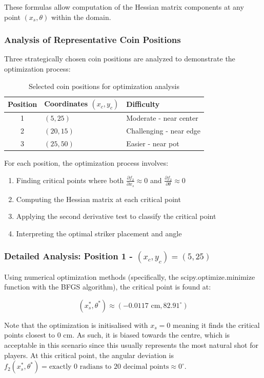 \documentclass[10pt]{article}
\begin{document}
These formulas allow computation of the Hessian matrix components at any point $(x_s, \theta)$ within the domain.

\subsubsection{Analysis of Representative Coin Positions}
Three strategically chosen coin positions are analyzed to demonstrate the optimization process:

\begin{table}[h]
\centering
\begin{tabular}{|c|l|l|}
\hline
\textbf{Position} & \textbf{Coordinates $(x_c, y_c)$} & \textbf{Difficulty} \\
\hline
1 & $(5, 25)$ & Moderate - near center \\
2 & $(20, 15)$ & Challenging - near edge \\
3 & $(25, 50)$ & Easier - near pot \\
\hline
\end{tabular}
\caption{Selected coin positions for optimization analysis}
\end{table}

For each position, the optimization process involves:
\begin{enumerate}
    \item Finding critical points where both $\frac{\partial f_2}{\partial x_s} \approx 0$ and $\frac{\partial f_2}{\partial \theta} \approx 0$
    \item Computing the Hessian matrix at each critical point
    \item Applying the second derivative test to classify the critical point
    \item Interpreting the optimal striker placement and angle
\end{enumerate}

\subsubsection{Detailed Analysis: Position 1 - $(x_c, y_c) = (5, 25)$}

Using numerical optimization methods (specifically, the scipy.optimize.minimize function with the BFGS algorithm), the critical point is found at:

\[
(x_s^*, \theta^*) \approx (-0.0117 \text{ cm}, 82.91^{\circ})
\]

Note that the optimization is initisalised with $x_s = 0$ meaning it finds the critical points closest to 0 cm. As such, it is biased towards the centre, which is acceptable in this scenario since this usually represents the most natural shot for players. At this critical point, the angular deviation is $f_2(x_s^*, \theta^*) = \text{exactly } 0 \text{ radians to 20 decimal points} \approx 0^\circ$.
\end{document}
